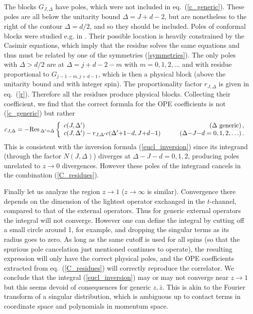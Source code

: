 \documentclass[11pt, reqno,preprint]{article}
\def\be{\begin{equation}}
\def\ee{\end{equation}}
\def\Res{{\rm Res\,}}
\def\zbar{\bar{z}}
\def\j{J}
\def\c{c}
\begin{document}
The blocks $G_{\j,\Delta}$ have poles, which were not included in eq.~(\ref{c_generic}).
These poles are all below the unitarity bound $\Delta=\j{+}d{-}2$, but are nonetheless to the right of the contour $\Delta=d/2$,
and so they should be included.
Poles of conformal blocks were studied e.g. in \cite{Kos:2013tga,Kos:2014bka}.
Their possible location is heavily constrained by the Casimir equations, which imply that the residue solves
the same equations and thus must be related by one of the symmetries (\ref{symmetries}).
The only poles with $\Delta>d/2$ are at $\Delta=j+d-2-m$ with $m=0,1,2,\ldots$
and with residue proportional to $G_{j-1-m,j+d-1}$,
which is then a physical block (above the unitarity bound and with integer spin).
The proportionality factor $r_{\j,\Delta}$ is given in eq.~(\ref{r}).
Therefore all the residues produce physical blocks.
Collecting their coefficient, we find that the correct formula for the OPE coefficients is not (\ref{c_generic}) but rather
\be
 \c_{\j,\Delta} = -\Res_{\Delta'=\Delta}\left\{
 \begin{array}{lr}
 \c(\j,\Delta') & \mbox{($\Delta$ generic)}\,,\\
 \c(\j,\Delta') - r_{\j,\Delta'} \c(\Delta'{+}1{-}d,\j{+}d{-}1)&\qquad (\Delta{-}\j{-}d=0,1,2,\ldots)\,. \label{C_residues}
\end{array}\right.
\ee
This is consistent with the inversion formula (\ref{eucl_inversion})
since its integrand (through the factor $N(\j,\Delta)$) diverges at
$\Delta{-}\j{-}d=0,1,2$, producing poles unrelated to $z\to 0$
divergences. However these poles of the integrand cancels in the combination (\ref{C_residues}).

Finally let us analyze the region $z\to 1$ ($z\to\infty$ is similar).
Convergence there depends on the dimension of the lightest operator exchanged in the $t$-channel,
compared to that of the external operators. Thus for generic external operators the integral will not converge.
However one can define the integral by cutting off a small circle around 1, for example,
and dropping the singular terms as its radius goes to zero.
As long as the same cutoff is used for all spins (so that the
spurious pole cancelation just mentioned continues to operate), the resulting expression will only have the correct physical poles,
and the OPE coefficients extracted from eq.~(\ref{C_residues}) will correctly reproduce the correlator.
We conclude that the integral (\ref{eucl_inversion}) may or may not converge near $z\to1$ but this seems devoid of consequences
for generic $z,\zbar$. This is akin to the Fourier transform of a singular distribution, which is ambiguous up to contact terms
in coordinate space and polynomials in momentum space.
\end{document}
